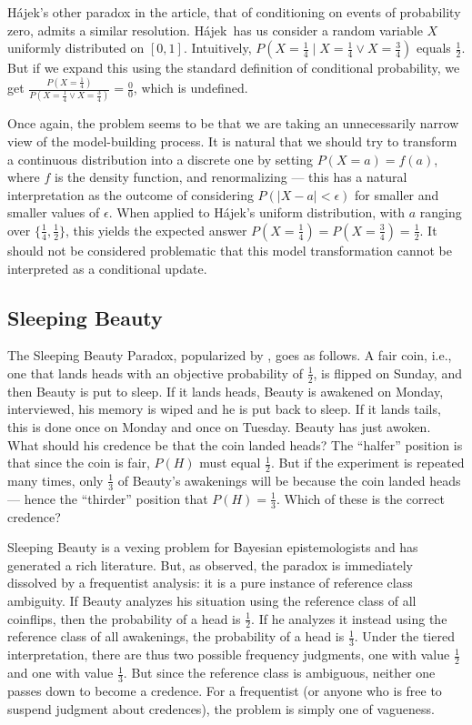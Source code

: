 \documentclass[letterpaper,12pt]{article}
\newcommand{\hajek}{H\'ajek}
\begin{document}
\hajek's other paradox in the article, that of conditioning on events of probability zero, admits a similar resolution. \hajek\ has us consider a random variable $X$ uniformly distributed on $[0, 1]$. Intuitively, $P(X = \frac{1}{4} \mid X = \frac{1}{4} \lor X = \frac{3}{4})$ equals $\frac{1}{2}$. But if we expand this using the standard definition of conditional probability, we get $\frac{P(X = \frac{1}{4})}{P(X = \frac{1}{4} \lor X = \frac{3}{4})} = \frac{0}{0}$, which is undefined.

Once again, the problem seems to be that we are taking an unnecessarily narrow view of the model-building process. It is natural that we should try to transform a continuous distribution into a discrete one by setting $P(X = a) = f(a)$, where $f$ is the density function, and renormalizing --- this has a natural interpretation as the outcome of considering $P(|X - a| < \epsilon)$ for smaller and smaller values of $\epsilon$. When applied to \hajek's uniform distribution, with $a$ ranging over $\{\frac{1}{4}, \frac{1}{2}\}$, this yields the expected answer $P(X = \frac{1}{4}) = P(X = \frac{3}{4}) = \frac{1}{2}$. It should not be considered problematic that this model transformation cannot be interpreted as a conditional update.

\subsection{Sleeping Beauty}
The Sleeping Beauty Paradox, popularized by \cite{Elga2000-ELGSBA}, goes as follows. A fair coin, i.e., one that lands heads with an objective probability of $\frac{1}{2}$, is flipped on Sunday, and then Beauty is put to sleep. If it lands heads, Beauty is awakened on Monday, interviewed, his memory is wiped and he is put back to sleep. If it lands tails, this is done once on Monday and once on Tuesday. Beauty has just awoken. What should his credence be that the coin landed heads? The ``halfer'' position is that since the coin is fair, $P(H)$ must equal $\frac{1}{2}$. But if the experiment is repeated many times, only $\frac{1}{3}$ of Beauty's awakenings will be because the coin landed heads --- hence the ``thirder'' position that $P(H) = \frac{1}{3}$. Which of these is the correct credence?

Sleeping Beauty is a vexing problem for Bayesian epistemologists and has generated a rich literature. But, as \cite{Halpern2004-HALSBR} observed, the paradox is immediately dissolved by a frequentist analysis: it is a pure instance of reference class ambiguity. If Beauty analyzes his situation using the reference class of all coinflips, then the probability of a head is $\frac{1}{2}$. If he analyzes it instead using the reference class of all awakenings, the probability of a head is $\frac{1}{3}$. Under the tiered interpretation, there are thus two possible frequency judgments, one with value $\frac{1}{2}$ and one with value $\frac{1}{3}$. But since the reference class is ambiguous, neither one passes down to become a credence. For a frequentist (or anyone who is free to suspend judgment about credences), the problem is simply one of vagueness.
\end{document}

